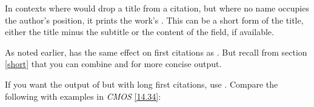 \documentclass[11pt,letterpaper,oneside]{article}
\begin{document}
\begin{optionlist}
In contexts where  would drop a title from a citation, but
where no name occupies the author's position, it prints the work's
. This can be a short form of the title, either
the title minus the subtitle or the content of the
 field, if available.

As noted earlier,  has the same effect on first citations
as . But recall from section \ref{short} that you can
combine  and  for more concise output.


\noindent If you want the output of  but with long first
citations, use . Compare the following with examples
in \textit{CMOS} \ref{14.34}:


\begin{citenobib}
\item \cite[3]{morrison2004a}
\item \cite[18]{morrison2004a}
\item \cite[18]{morrison2004a}
\item \cite[24--26]{morrison2004a}
\item \cite[401-2]{morrison2004b}
\item \cite[433]{morrison2004b}
\item \cite[37--38]{diaz2007}
\item \cite[403]{morrison2004b}
\item \cite[152]{diaz2007}
\item \cite[201-2]{diaz2007}
\item \cites[240]{morrison2004b}[32]{morrison2004a}
\item \cite[33]{morrison2004a}
\end{citenobib}



\end{optionlist}
\end{document}
